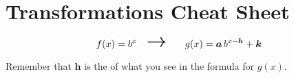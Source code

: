 \section{Transformations Cheat Sheet}

\begin{tcolorbox}[center,colback=white,width=3.5in,valign=center,]
{
    \vspace{-0.9\onelineskip}
    \begin{equation*}
        f(x)=b^x \text{\quad\huge$\rightarrow$\quad} g(x) = \bm{a} \, b^{x - \bm{h}} + \bm{k}
    \end{equation*}
}
\end{tcolorbox}
\begin{myWarningBox}
    \begin{center}
        Remember that $\bm{h}$ is the  
        of what you see in the formula for $g(x)$.
    \end{center}
\end{myWarningBox}


